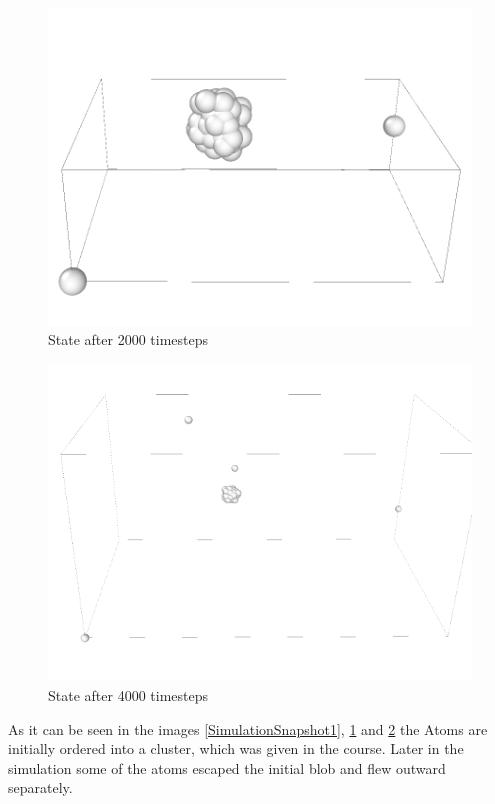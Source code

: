 \begin{figure}
	\begin{center}
		\includegraphics[scale= 0.75]{Figure/2ImageS.png}
	\end{center}
	\caption[Simulation Snapshot 2]{State after 2000 timesteps}
	\label{SimulationSnapshot2}
\end{figure}

\begin{figure}
	\begin{center}
		\includegraphics[scale= 0.65]{Figure/3ImageS.png}
	\end{center}
	\caption[Simulation Snapshot 3]{State after 4000 timesteps}
	\label{SimulationSnapshot3}
\end{figure}
As it can be seen in the images \ref{SimulationSnapshot1}, \ref{SimulationSnapshot2} and \ref{SimulationSnapshot3} the Atoms are initially ordered into a cluster, which was given in the course. 
Later in the simulation some of the atoms escaped the initial blob and flew outward separately. 
